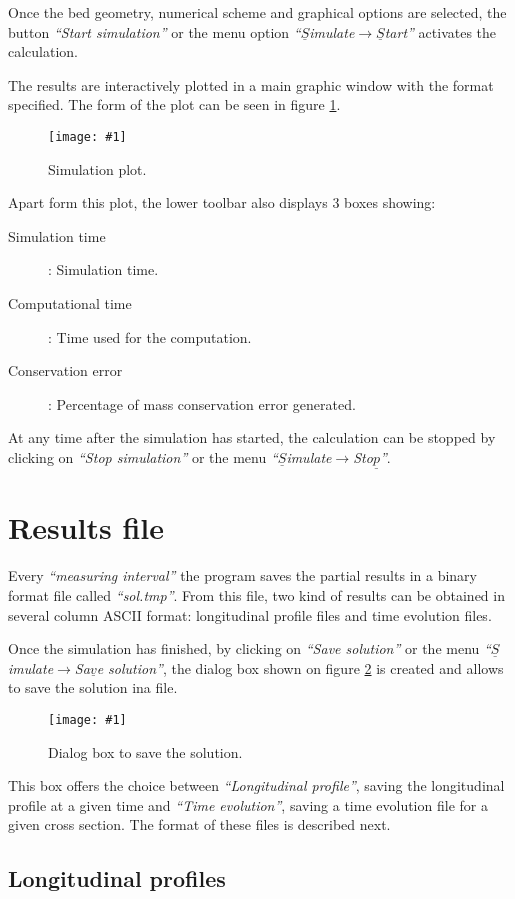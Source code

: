 \documentclass[a4paper,12pt]{article}
\newcommand{\fig}[3]
{
	\begin{figure}[ht!]
		\centering
		\texttt{[image: \#1]}
		\caption{#2.\label{#3}}
	\end{figure}
}
\newcommand{\IT}[1]{{\sl ``#1''}}
\begin{document}
Once the bed geometry, numerical scheme and graphical options are selected, the
button \IT{Start simulation}  or the menu option
\IT{$\underline{S}$imulate$\rightarrow\underline{S}$tart} activates the
calculation.

The results are interactively plotted in a main graphic window with the format
specified. The form of the plot can be seen in figure \ref{FigSimulacion}.
\fig{Simulation.ps}{Simulation plot}{FigSimulacion}

Apart form this plot, the lower toolbar also displays 3 boxes showing:
\begin{description}
\item[Simulation time]: Simulation time.
\item[Computational time]: Time used for the computation.
\item[Conservation error]: Percentage of mass conservation error generated.
\end{description}

At any time after the simulation has started, the calculation can be stopped by clicking on \IT{Stop simulation} or the menu
\IT{$\underline{S}$imulate$\rightarrow$Sto$\underline{p}$}.

\section{Results file}

Every \IT{measuring interval} the program saves the partial results in a binary
format file called \IT{sol.tmp}. From this file, two kind of results can be
obtained in several column ASCII format: longitudinal profile files and time evolution files. 

Once the simulation has finished, by clicking on \IT{Save solution} or the menu \IT{$\underline{S}$imulate$\rightarrow$Sa$\underline{v}$e solution}, the dialog box shown on figure \ref{FigGuardar} is created and allows to save the solution ina file.
\fig{Save.ps}{Dialog box to save the solution}{FigGuardar}
This box offers the choice between \IT{Longitudinal profile}, saving the longitudinal profile at a given time and \IT{Time evolution}, saving a time evolution file for a given cross section. The format of these files is described next. 

\subsection{Longitudinal profiles}
\end{document}
